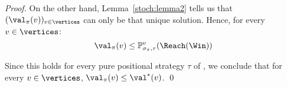 \begin{proof}
  On the other hand, Lemma~\ref{stoch:lemma2} tells us that
  $(\val_\perm(v))_{v \in\vertices}$ can only be that unique
  solution. Hence, for every $v \in \vertices$:
  \[
  \val_\perm(v) \le \probm_{\sigma_\perm,\tau}^v(\Reach(\Win))
  \]


  Since this holds for every pure positional strategy $\tau$ of \Adam,
  we conclude that for every $v \in \vertices$,
  $\val_\perm(v) \le \val^*(v)$. \qed
\end{proof}

